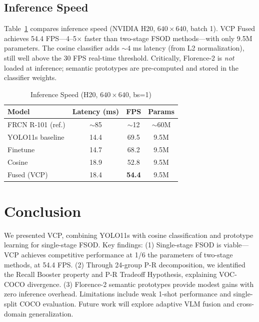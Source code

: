 \documentclass[conference]{IEEEtran}
\begin{document}
\subsection{Inference Speed}

Table~\ref{tab:fps} compares inference speed (NVIDIA H20, $640\times640$, batch 1). VCP Fused achieves 54.4 FPS---4--5$\times$ faster than two-stage FSOD methods---with only 9.5M parameters. The cosine classifier adds $\sim$4 ms latency (from L2 normalization), still well above the 30 FPS real-time threshold. Critically, Florence-2 is \textit{not} loaded at inference; semantic prototypes are pre-computed and stored in the classifier weights.

\begin{table}[ht]
\centering
\caption{Inference Speed (H20, $640\times640$, bs=1)}
\label{tab:fps}
\begin{tabular}{lccc}
\toprule
Model & Latency (ms) & FPS & Params \\
\midrule
FRCN R-101 (ref.) & $\sim$85 & $\sim$12 & $\sim$60M \\
\midrule
YOLO11s baseline & 14.4 & 69.5 & 9.5M \\
Finetune          & 14.7 & 68.2 & 9.5M \\
Cosine            & 18.9 & 52.8 & 9.5M \\
Fused (VCP)       & 18.4 & \textbf{54.4} & 9.5M \\
\bottomrule
\end{tabular}
\end{table}
\vspace{-6pt}
\section{Conclusion}

We presented VCP, combining YOLO11s with cosine classification and prototype learning for single-stage FSOD. Key findings: (1) Single-stage FSOD is viable---VCP achieves competitive performance at 1/6 the parameters of two-stage methods, at 54.4 FPS. (2) Through 24-group P-R decomposition, we identified the Recall Booster property and P-R Tradeoff Hypothesis, explaining VOC-COCO divergence. (3) Florence-2 semantic prototypes provide modest gains with zero inference overhead. Limitations include weak 1-shot performance and single-split COCO evaluation. Future work will explore adaptive VLM fusion and cross-domain generalization.
\end{document}
